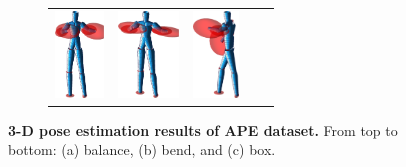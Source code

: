 \begin{figure}
\begin{subfigure}[b]{1\linewidth}
\begin{tabular}{c|cccc}
			\includegraphics[height=2.3cm]{fig/body/APE/boxx2.png} &
			\includegraphics[height=2.3cm]{fig/body/APE/boxx3.png} & 
			\includegraphics[height=2.3cm]{fig/body/APE/boxx4.png} 
		\end{tabular}
		\label{fig/body/APE/boxx} 
	\end{subfigure}
	\caption{\textbf{3-D pose estimation results of APE dataset.} From top to bottom: (a) balance, (b) bend, and (c) box.}
	\label{fig/body/APE1}
\end{figure}


